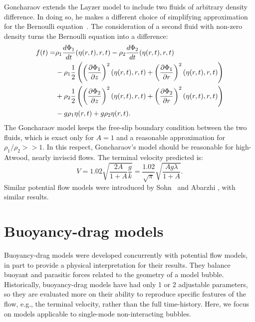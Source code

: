 Goncharaov extends the Layzer model to include two fluids of arbitrary density difference.
In doing so, he makes a different choice of simplifying approximation for the Bernoulli equation~\cite{Goncharov2002}.
The consideration of a second fluid with non-zero density turns the Bernoulli equation  into a difference:
\begin{equation} \label{eqn:GonBernoulli}
\begin{aligned}
f(t) = &   \rho_1 \frac{d \Phi_1}{d t}(\eta(r,t), r, t) - \rho_2 \frac{d \Phi_2}{d t}(\eta(r,t), r, t) \\
& - \rho_1 \frac{1}{2} \left(\left(\frac{\partial \Phi_1}{\partial z}\right)^2(\eta(r,t), r, t) +\left(\frac{\partial \Phi_1}{\partial r}\right)^2(\eta(r,t), r, t)\right) \\
& + \rho_2 \frac{1}{2} \left(\left(\frac{\partial \Phi_2}{\partial z}\right)^2(\eta(r,t), r, t) +\left(\frac{\partial \Phi_2}{\partial r}\right)^2(\eta(r,t), r, t)\right) \\
& - g \rho_1 \eta(r,t) + g \rho_2 \eta(r,t).
\end{aligned}
\end{equation}
The Goncharaov model keeps the free-slip boundary condition between the two fluids, which is exact only for $A = 1$ and a reasonable approximation for $\rho_1 / \rho_2 >> 1$.
In this respect, Goncharaov's model should be reasonable for high-Atwood, nearly inviscid flows.
The terminal velocity predicted is:
\begin{equation}
V = 1.02 \sqrt{\frac{2A }{1 + A} \frac{g}{k}} = \frac{1.02}{\sqrt{\pi}} \sqrt{\frac{A g \lambda}{1 + A}}.
\end{equation}
Similar potential flow models were introduced by Sohn~\cite{Sohn2003} and Abarzhi \etal\cite{Abarzhi2003}, with similar results.

\section{Buoyancy-drag models}

Buoyancy-drag models were developed concurrently with potential flow models, in part to provide a physical interpretation for their results.
They balance buoyant and parasitic forces related to the geometry of a model bubble.
Historically, buoyancy-drag models have had only 1 or 2 adjustable parameters, so they are evaluated more on their ability to reproduce specific features of the flow, e.g., the terminal velocity, rather than the full time-history.
Here, we focus on models applicable to single-mode non-interacting bubbles.

